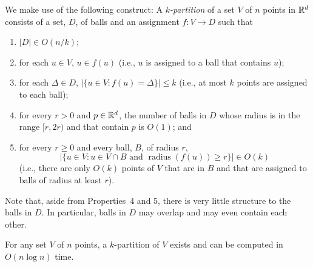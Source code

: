 \documentclass{patmorin}
\DeclareMathOperator{\radius}{radius}
\begin{document}
We make use of the following construct:  A \emph{$k$-partition} of a
set $V$ of $n$ points in $\mathbb{R}^d$ consists of a set, $D$, of balls and an
assignment $f:V\to D$ such that
\begin{enumerate}
  \item $|D|\in O(n/k)$;
  \item for each $u\in V$, $u\in f(u)$ (i.e., $u$ is assigned to a
    ball that contains $u$);
  \item for each $\Delta\in D$, $|\{u\in V: f(u)=\Delta\}|\le k$ (i.e.,
   at most $k$ points are assigned to each ball);
  \item for every $r> 0$ and $p\in\mathbb{R}^d$, the number of balls
   in $D$ whose radius is in the range $[r,2r)$ and that contain $p$
   is $O(1)$; and
  \item for every $r\ge 0$ and every ball, $B$, of radius $r$, 
   \[
      |\{ u\in V : u\in V\cap B\text{ and } \radius(f(u))\ge r\}| \in O(k)
   \] 
   (i.e., there are only $O(k)$ points
   of $V$ that are in $B$ and that are assigned to balls of radius at
   least $r$).
\end{enumerate}

Note that, aside from Properties~4 and 5, there is very little structure
to the balls in $D$. In particular, balls in $D$ may overlap and may
even contain each other.  

\begin{lem}
  For any set $V$ of $n$ points, a $k$-partition of $V$ exists and can
  be computed in $O(n\log n)$ time.
\end{lem}
\end{document}
